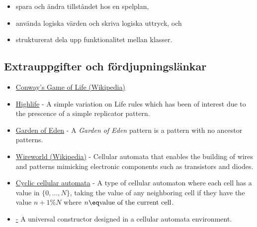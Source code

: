 \begin{Datorarbete}
\begin{itemize}
            \item spara och ändra tillståndet hos en spelplan,

            \item använda logiska värden och skriva logiska uttryck, och

            \item strukturerat dela upp funktionalitet mellan klasser.
        \end{itemize}

    \subsection{Extrauppgifter och fördjupningslänkar}


        \begin{itemize}
                \item \href{https://en.wikipedia.org/wiki/Conway's_Game_of_Life}{Conway's Game of Life (Wikipedia)}
                \item \href{https://en.wikipedia.org/wiki/Highlife_(cellular_automaton)}{Highlife} - A simple variation on Life rules which has been of interest due to the prescence of a simple replicator pattern.
        \end{itemize}

        \begin{itemize}
                \item \href{https://en.wikipedia.org/wiki/Garden_of_Eden_(cellular_automaton)}{Garden of Eden} - A \emph{Garden of Eden} pattern is a pattern with no ancestor patterns.
        \end{itemize}

        \begin{itemize}
        \end{itemize}

        \begin{itemize}
                \item \href{https://en.wikipedia.org/wiki/Wireworld}{Wireworld (Wikipedia)} - Cellular automata that enables the building of wires and patterns mimicking electronic components such as transistors and diodes.
                \item \href{https://en.wikipedia.org/wiki/Cyclic cellular automata}{Cyclic cellular automata} - A type of cellular automaton where each cell has a value in $\{0, \dots, N\}$, taking the value of any neighboring cell if they have the value $n+1 \% N$ where $n \eq \text{value of the current cell}$.
                \item \href{https://en.wikipedia.org/wiki/Von_Neumann_universal_constructor} - A universal constructor designed in a cellular automata environment.
        \end{itemize}

\end{Datorarbete}
